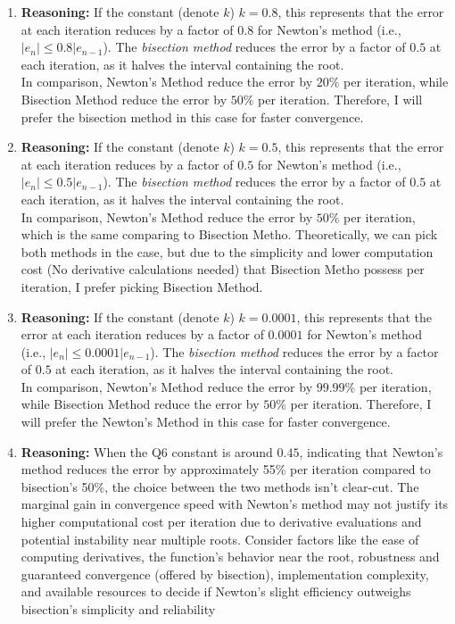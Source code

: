 \documentclass{article}
\begin{document}
\begin{enumerate}
    \item \textbf{Reasoning: } If the constant (denote $k$) $k = 0.8$, this represents that the error at each iteration reduces by a factor of $0.8$ for Newton's method (i.e., $|e_n| \leq 0.8 |e_{n-1}$).
    The \textit{bisection method} reduces the error by a factor of $0.5$ at each iteration, as it halves the interval containing the root.
    \\
    In comparison, Newton's Method reduce the error by $20\%$ per iteration, while Bisection Method reduce the error by $50\%$ per iteration. Therefore, I will prefer the bisection method in this case for faster convergence.
    \item \textbf{Reasoning: } If the constant (denote $k$) $k = 0.5$, this represents that the error at each iteration reduces by a factor of $0.5$ for Newton's method (i.e., $|e_n| \leq 0.5 |e_{n-1}$).
    The \textit{bisection method} reduces the error by a factor of $0.5$ at each iteration, as it halves the interval containing the root.
    \\
    In comparison, Newton's Method reduce the error by $50\%$ per iteration, which is the same comparing to Bisection Metho. Theoretically, we can pick both methods in the case, but due to the simplicity and lower
    computation cost (No derivative calculations needed) that Bisection Metho possess per iteration, I prefer picking Bisection Method.
    \item \textbf{Reasoning: } If the constant (denote $k$) $k = 0.0001$, this represents that the error at each iteration reduces by a factor of $0.0001$ for Newton's method (i.e., $|e_n| \leq 0.0001 |e_{n-1}$).
    The \textit{bisection method} reduces the error by a factor of $0.5$ at each iteration, as it halves the interval containing the root.
    \\
    In comparison, Newton's Method reduce the error by $99.99\%$ per iteration, while Bisection Method reduce the error by $50\%$ per iteration. Therefore, I will prefer the Newton's Method in this case for faster convergence.
    \item \textbf{Reasoning: } When the Q6 constant is around \(0.45\), indicating that Newton's method reduces the error by approximately 55\% per iteration compared to bisection's 50\%, the choice between the two methods isn't clear-cut. The marginal gain in convergence speed with Newton's method may not justify its higher computational cost per iteration due to derivative evaluations and potential instability near multiple roots.
    Consider factors like the ease of computing derivatives, the function's behavior near the root, robustness and guaranteed convergence (offered by bisection), implementation complexity, and available resources to decide if Newton's slight efficiency outweighs bisection's simplicity and reliability
\end{enumerate}
\end{document}
